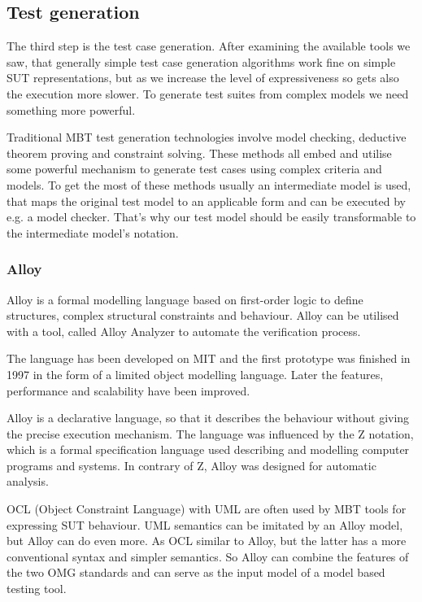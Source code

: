 
\subsection{Test generation}
\label{sub:designtestgeneration}

\item The third step is the test case generation. After examining the available tools we saw, that generally simple test case generation algorithms work fine on simple SUT representations, but as we increase the level of expressiveness so gets also the execution more slower. To generate test suites from complex models we need something more powerful.

Traditional MBT test generation technologies involve model checking, deductive theorem proving and constraint solving. These methods all embed and utilise some powerful mechanism to generate test cases using complex criteria and models. To get the most of these methods usually an intermediate model is used, that maps the original test model to an applicable form and can be executed by e.g. a model checker. That's why our test model should be easily transformable to the intermediate model's notation.

\subsubsection{Alloy}
\label{ssub:alloy}

Alloy is a formal modelling language based on first-order logic to define structures, complex structural constraints and behaviour. Alloy can be utilised with a tool, called Alloy Analyzer to automate the verification process.

The language has been developed on MIT and the first prototype was finished in 1997 in the form of a limited object modelling language. Later the features, performance and scalability have been improved.

Alloy is a declarative language, so that it describes the behaviour without giving the precise execution mechanism. The language was influenced by the Z notation, which is a formal specification language used describing and modelling computer programs and systems. In contrary of Z, Alloy was designed for automatic analysis.

OCL (Object Constraint Language) with UML are often used by MBT tools for expressing SUT behaviour. UML semantics can be imitated by an Alloy model, but Alloy can do even more. As OCL similar to Alloy, but the latter has a more conventional syntax and simpler semantics. So Alloy can combine the features of the two OMG standards and can serve as the input model of a model based testing tool.

